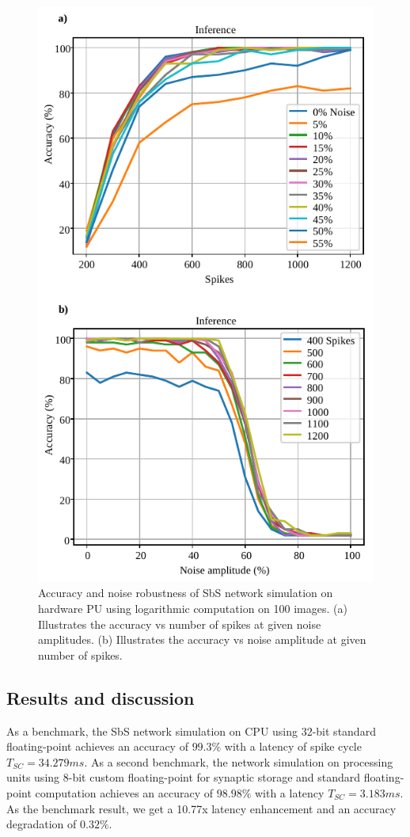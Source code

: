 \begin{figure}[h!]
	\centering
	\includegraphics[width=1\columnwidth]{../figures/accuracy_vs_noise_pu_log.pdf}
	\caption{Accuracy and noise robustness of SbS network simulation on hardware PU using logarithmic computation on 100 images. (a) Illustrates the accuracy vs number of spikes at given noise amplitudes. (b) Illustrates the accuracy vs noise amplitude at given number of spikes.}
	\label{fig:accuracy_vs_noise_pu_log}
\end{figure}


\subsection{Results and discussion}
As a benchmark, the SbS network simulation on CPU using 32-bit standard floating-point achieves an accuracy of $99.3\%$ with a latency of spike cycle $T_{SC} = 34.279ms$. As a second benchmark, the network simulation on processing units using 8-bit custom floating-point for synaptic storage and standard floating-point computation achieves an accuracy of $98.98\%$ with a latency $T_{SC}=3.183ms$. As the benchmark result, we get a 10.77x latency enhancement and an accuracy degradation of $0.32\%$.

